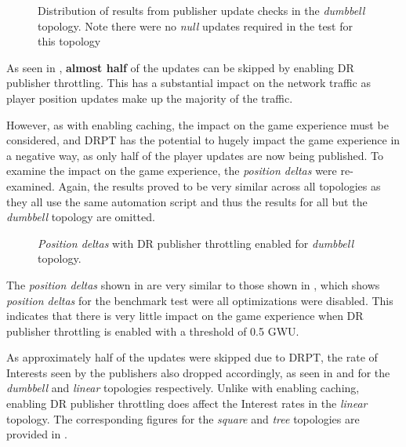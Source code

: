 \begin{figure}[H]
    \centering
    \caption{Distribution of results from publisher update checks in the \textit{dumbbell} topology. Note there were no \textit{null} updates required in the test for this topology}
    \label{fig:eval:caching:dr-pub-throt:counters:dumbbell}
\end{figure}

As seen in , \textbf{almost half} of the updates can be skipped by enabling DR publisher throttling. This has a substantial impact on the network traffic as player position updates make up the majority of the traffic.

However, as with enabling caching, the impact on the game experience must be considered, and DRPT has the potential to hugely impact the game experience in a negative way, as only half of the player updates are now being published. To examine the impact on the game experience, the \textit{position deltas} were re-examined. Again, the results proved to be very similar across all topologies as they all use the same automation script and thus the results for all but the \textit{dumbbell} topology are omitted.

\begin{figure}[H]
    \centering
    \caption{\textit{Position deltas} with DR publisher throttling enabled for \textit{dumbbell} topology.}
    \label{fig:eval:caching:dr-pub-throt:pos-deltas:dumbbell}
\end{figure}

The \textit{position deltas} shown in  are very similar to those shown in , which shows \textit{position deltas} for the benchmark test were all optimizations were disabled. This indicates that there is very little impact on the game experience when DR publisher throttling is enabled with a threshold of 0.5 GWU.

As approximately half of the updates were skipped due to DRPT, the rate of Interests seen by the publishers also dropped accordingly, as seen in  and  for the \textit{dumbbell} and \textit{linear} topologies respectively. Unlike with enabling caching, enabling DR publisher throttling does affect the Interest rates in the \textit{linear} topology. The corresponding figures for the \textit{square} and \textit{tree} topologies are provided in .

